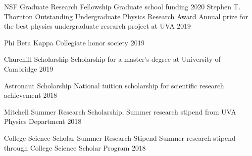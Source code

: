 



\begin{cvhonors}
  \cvhonor
    {NSF Graduate Research Fellowship} %
    {Graduate school funding} %
    {} %
    {2020} %
  \cvhonor
    {Stephen T. Thornton Outstanding Undergraduate Physics Research Award} %
    {Annual prize for the best physics undergraduate research project at UVA} %
    {} %
    {2019} %

  \cvhonor
    {Phi Beta Kappa} %
    {Collegiate honor society} %
    {} %
    {2019} %

  \cvhonor
    {Churchill Scholarship} %
    {Scholarship for a master’s degree at University of Cambridge} %
    {} %
    {2019} %
    
  \cvhonor
    {Astronaut Scholarship} %
    {National tuition scholarship for scientific research achievement} %
    {} %
    {2018} %
    
    
  \cvhonor
    {Mitchell Summer Research Scholarship,} %
    {Summer research stipend from UVA Physics Department} %
    {} %
    {2018} %
    
  \cvhonor
    { College Science Scholar Summer Research Stipend} %
    {Summer research stipend through College Science Scholar Program} %
    {} %
    {2018} %
    

\end{cvhonors}

